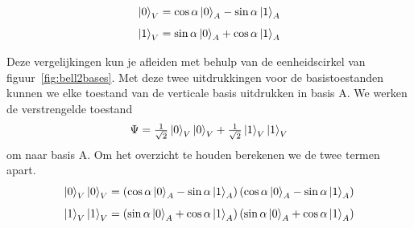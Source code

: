 \documentclass[../../main.tex]{subfiles}
\begin{document}
\[\ket{0}_V = \cos{\alpha}\ket{0}_A-\sin{\alpha}\ket{1}_A\]
\[\ket{1}_V = \sin{\alpha}\ket{0}_A+\cos{\alpha}\ket{1}_A\]

Deze vergelijkingen kun je afleiden met behulp van de eenheidscirkel van figuur~\ref{fig:bell2bases}. Met deze twee uitdrukkingen voor de basistoestanden kunnen we elke toestand van de verticale basis uitdrukken in basis A. We werken de verstrengelde toestand 
\[\Psi=\tfrac{1}{\sqrt{2}}\ket{0}_V\ket{0}_V+\tfrac{1}{\sqrt{2}}\ket{1}_V\ket{1}_V\]
om naar basis A. Om het overzicht te houden berekenen we de twee termen apart.
\[\ket{0}_V\ket{0}_V = \left(\cos{\alpha}\ket{0}_A-\sin{\alpha}\ket{1}_A\right)\left(\cos{\alpha}\ket{0}_A-\sin{\alpha}\ket{1}_A\right)\]
\[\ket{1}_V\ket{1}_V = \left(\sin{\alpha}\ket{0}_A+\cos{\alpha}\ket{1}_A\right)\left(\sin{\alpha}\ket{0}_A+\cos{\alpha}\ket{1}_A\right)\]
\end{document}
